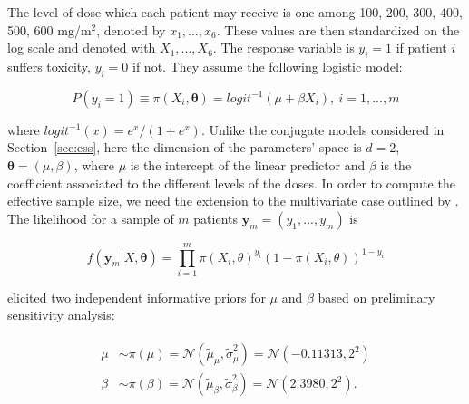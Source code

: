 \documentclass{statsoc}
\begin{document}
The level of dose which each patient may receive is one among 100, 200, 300, 400, 500, 600 mg/m$^{2}$, denoted by $x_{1},\ldots,x_{6}$. These values are  then standardized on the log scale and denoted with $X_{1},...,X_{6}$. The response variable is $y_{i}=1$ if patient $i$ suffers toxicity, $y_{i}=0$ if not. They assume the following logistic model:

\begin{equation}
P(y_{i}=1) \equiv \pi(X_{i}, \bm{\theta})=logit^{-1}(\mu+\beta X_{i}) , \ i=1,...,m
\label{eq:logit}
\end{equation}

where $logit^{-1}(x)=e^{x}/(1+e^{x})$. Unlike the conjugate models considered in Section~\ref{sec:ess}, here the dimension of the parameters' space is $d=2$, $\bm{\theta}=(\mu, \beta)$, where $\mu$ is the intercept of the linear predictor and $\beta$ is the coefficient associated to the different levels of the doses. In order to compute the effective sample size, we need the extension to the multivariate case outlined by \cite{morita2008determining}. The likelihood for a sample of $m$ patients $\bm{y}_{m}=(y_{1},...,y_{m})$ is

\begin{equation}
f(\bm{y}_{m}| X, \bm{\theta})=\prod_{i=1}^{m}\pi(X_{i}, \theta)^{y_{i}}(1-\pi(X_{i}, \theta))^{1-y_{i}}
\label{eq:likelihood_logistic}
\end{equation}

\cite{thall2003practical} elicited two independent informative priors for $\mu$ and $\beta$ based on preliminary sensitivity analysis:

\begin{align}
\begin{split}
\mu &\sim \pi(\mu)=\mathcal{N}(\tilde{\mu}_{\mu}, \tilde{\sigma}^{2}_{\mu})=  \mathcal{N}(-0.11313, 2^{2})\\
  \beta & \sim \pi(\beta)= \mathcal{N}(\tilde{\mu}_{\beta}, \tilde{\sigma}^{2}_{\beta})= \mathcal{N}(2.3980, 2^{2}).
  \end{split}
  \label{eq:phaseI_thall_priors}
  \end{align} 
  
\end{document}

